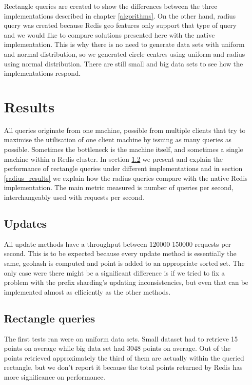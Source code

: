 \documentclass[times, utf8, diplomski]{fer}
\begin{document}
Rectangle queries are created to show the differences between the three implementations described in chapter \ref{algorithms}. On the other hand, radius query was created because Redis geo features only support that type of query and we would like to compare solutions presented here with the native implementation. This is why there is no need to generate data sets with uniform and normal distribution, so we generated circle centres using uniform and radius using normal distribution. There are still small and big data sets to see how the implementations respond.

\chapter {Results}
All queries originate from one machine, possible from multiple clients that try to maximise the utilisation of one client machine by issuing as many queries as possible. Sometimes the bottleneck is the machine itself, and sometimes a single machine within a Redis cluster. In section \ref{rectangle_results} we present and explain the performance of rectangle queries under different implementations and in section \ref{radius_results} we explain how the radius queries compare with the native Redis implementation. The main metric measured is number of queries per second, interchangeably used with requests per second.

\section {Updates}
All update methods have a throughput between 120000-150000 requests per second. This is to be expected because every update method is essentially the same, geohash is computed and point is added to an appropriate sorted set. The only case were there might be a significant difference is if we tried to fix a problem with the prefix sharding's updating inconsistencies, but even that can be implemented almost as efficiently as the other methods.

\section {Rectangle queries} \label {rectangle_results}
The first tests ran were on uniform data sets. Small dataset had to retrieve 15 points on average while big data set had 3048 points on average. Out of the points retrieved approximately the third of them are actually within the queried rectangle, but we don't report it because the total points returned by Redis has more significance on performance. 
\end{document}
